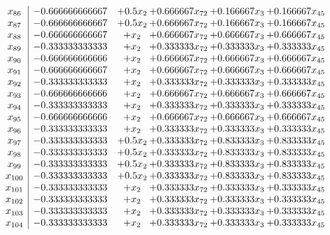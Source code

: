 \documentclass[11pt]{article}
\begin{document}
\[\begin{array}{c| c c@{\hskip 2pt} c@{\hskip 2pt} c@{\hskip 2pt} c@{\hskip 2pt} }
 x_{86}   &  -0.666666666667 & + 0.5 x_{2} & + 0.666667 x_{72} & + 0.166667 x_{3} & + 0.166667 x_{45}\\
 x_{87}   &  -0.666666666667 & + 0.5 x_{2} & + 0.666667 x_{72} & + 0.166667 x_{3} & + 0.166667 x_{45}\\
 x_{88}   &  -0.666666666667 & +  x_{2} & + 0.666667 x_{72} & + 0.666667 x_{3} & + 0.666667 x_{45}\\
 x_{89}   &  -0.333333333333 & +  x_{2} & + 0.333333 x_{72} & + 0.333333 x_{3} & + 0.333333 x_{45}\\
 x_{90}   &  -0.666666666666 & +  x_{2} & + 0.666667 x_{72} & + 0.666667 x_{3} & + 0.666667 x_{45}\\
 x_{91}   &  -0.666666666667 & +  x_{2} & + 0.666667 x_{72} & + 0.666667 x_{3} & + 0.666667 x_{45}\\
 x_{92}   &  -0.333333333333 & +  x_{2} & + 0.333333 x_{72} & + 0.333333 x_{3} & + 0.333333 x_{45}\\
 x_{93}   &  -0.666666666666 & +  x_{2} & + 0.666667 x_{72} & + 0.666667 x_{3} & + 0.666667 x_{45}\\
 x_{94}   &  -0.333333333333 & +  x_{2} & + 0.333333 x_{72} & + 0.333333 x_{3} & + 0.333333 x_{45}\\
 x_{95}   &  -0.666666666666 & +  x_{2} & + 0.666667 x_{72} & + 0.666667 x_{3} & + 0.666667 x_{45}\\
 x_{96}   &  -0.333333333333 & +  x_{2} & + 0.333333 x_{72} & + 0.333333 x_{3} & + 0.333333 x_{45}\\
 x_{97}   &  -0.333333333333 & + 0.5 x_{2} & + 0.333333 x_{72} & + 0.833333 x_{3} & + 0.833333 x_{45}\\
 x_{98}   &  -0.333333333333 & + 0.5 x_{2} & + 0.333333 x_{72} & + 0.833333 x_{3} & + 0.833333 x_{45}\\
 x_{99}   &  -0.333333333333 & + 0.5 x_{2} & + 0.333333 x_{72} & + 0.833333 x_{3} & + 0.833333 x_{45}\\
 x_{100}   &  -0.333333333333 & + 0.5 x_{2} & + 0.333333 x_{72} & + 0.833333 x_{3} & + 0.833333 x_{45}\\
 x_{101}   &  -0.333333333333 & +  x_{2} & + 0.333333 x_{72} & + 0.333333 x_{3} & + 0.333333 x_{45}\\
 x_{102}   &  -0.333333333333 & +  x_{2} & + 0.333333 x_{72} & + 0.333333 x_{3} & + 0.333333 x_{45}\\
 x_{103}   &  -0.333333333333 & +  x_{2} & + 0.333333 x_{72} & + 0.333333 x_{3} & + 0.333333 x_{45}\\
 x_{104}   &  -0.333333333333 & +  x_{2} & + 0.333333 x_{72} & + 0.333333 x_{3} & + 0.333333 x_{45}\\

\end{array}\]
\end{document}

